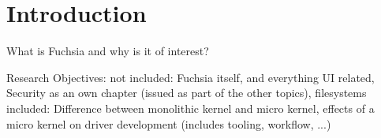 
\chapter{Introduction} \label{ch:introduction}

What is Fuchsia and why is it of interest?

Research Objectives:
    not included:
        Fuchsia itself, and everything UI related, Security as an own chapter (issued as part of the other topics), filesystems
    included: 
        Difference between monolithic kernel and micro kernel, effects of a micro kernel on driver development (includes tooling, workflow, ...)

